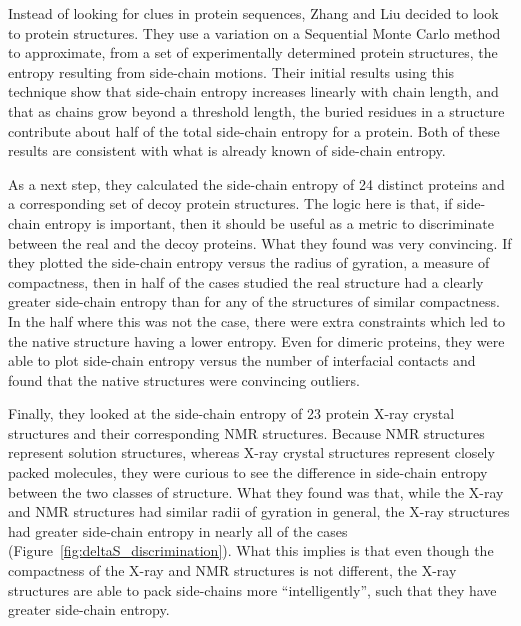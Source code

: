 Instead of looking for clues in protein sequences, Zhang and Liu\cite{Zhang:2006p11} decided to look to protein structures. They use a variation on a Sequential Monte Carlo method to approximate, from a set of experimentally determined protein structures, the entropy resulting from side-chain motions. Their initial results using this technique show that side-chain entropy increases linearly with chain length, and that as chains grow beyond a threshold length, the buried residues in a structure contribute about half of the total side-chain entropy for a protein. Both of these results are consistent with what is already known of side-chain entropy.

As a next step, they calculated the side-chain entropy of 24 distinct proteins and a corresponding set of decoy protein structures. The logic here is that, if side-chain entropy is important, then it should be useful as a metric to discriminate between the real and the decoy proteins. What they found was very convincing. If they plotted the side-chain entropy versus the radius of gyration, a measure of compactness, then in half of the cases studied the real structure had a clearly greater side-chain entropy than for any of the structures of similar compactness. In the half where this was not the case, there were extra constraints which led to the native structure having a lower entropy. Even for dimeric proteins, they were able to plot side-chain entropy versus the number of interfacial contacts and found that the native structures were convincing outliers.

Finally, they looked at the side-chain entropy of 23 protein X-ray crystal structures and their corresponding NMR structures. Because NMR structures represent solution structures, whereas X-ray crystal structures represent closely packed molecules, they were curious to see the difference in side-chain entropy between the two classes of structure. What they found was that, while the X-ray and NMR structures had similar radii of gyration in general, the X-ray structures had greater side-chain entropy in nearly all of the cases (Figure~\ref{fig:deltaS_discrimination}). What this implies is that even though the compactness of the X-ray and NMR structures is not different, the X-ray structures are able to pack side-chains more ``intelligently'', such that they have greater side-chain entropy.

